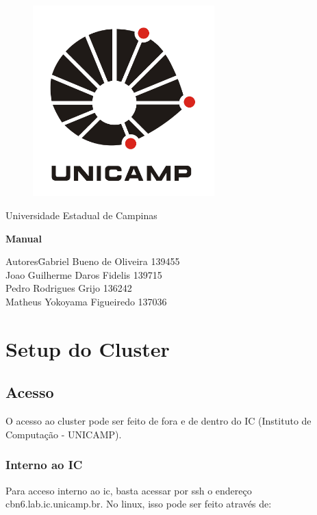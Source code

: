 \documentclass[a4paper,10pt]{article}
\date{\today}
\begin{document}
	\begin{titlepage}
		\begin{figure}
			\centering
			\includegraphics[width=7cm,keepaspectratio=true]{imagens/unicamp.png}
	
		\end{figure}
		\begin{center}
			\huge{Universidade Estadual de Campinas}
		
		\vfill
		\textbf{\LARGE{Manual}}
		\vfill
		\end{center}
		
		\begin{flushleft}
			\begin{tabbing}
				Autores\qquad\qquad\= Gabriel Bueno de Oliveira 139455 \\
					\>Joao Guilherme Daros Fidelis 139715 \\
					\>Pedro Rodrigues Grijo 136242\\
					\>Matheus Yokoyama Figueiredo 137036\\
			\end{tabbing}
		\end{flushleft}
	\end{titlepage}

\newpage
\section{Setup do Cluster}
    \subsection{Acesso}
    O acesso ao cluster pode ser feito de fora e de dentro do IC (Instituto de Computação - UNICAMP).
        \subsubsection{Interno ao IC}
        Para acceso interno ao ic, basta acessar por ssh o endereço cbn6.lab.ic.unicamp.br. No linux, isso pode ser feito através de:
        
\end{document}
